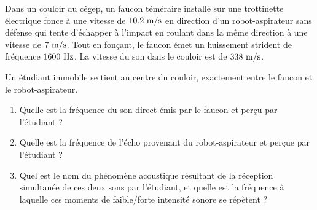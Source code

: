 Dans un couloir du cégep, un faucon téméraire installé sur une trottinette électrique fonce à une vitesse de $10.2\text{ m/s}$ en direction d'un robot-aspirateur sans défense qui tente d'échapper à l'impact en roulant dans la même direction à une vitesse de $7\text{ m/s}$. Tout en fonçant, le faucon émet un huissement strident de fréquence $1600\text{ Hz}$. La vitesse du son dans le couloir est de $338\text{ m/s}$.

Un étudiant immobile se tient au centre du couloir, exactement entre le faucon et le robot-aspirateur.
    \begin{enumerate}[label=\alph*)]
        \item Quelle est la fréquence du son direct émis par le faucon et perçu par l'étudiant ?
        \item Quelle est la fréquence de l'écho provenant du robot-aspirateur et perçue par l'étudiant ?
        \item Quel est le nom du phénomène acoustique résultant de la réception simultanée de ces deux sons par l'étudiant, et quelle est la fréquence à laquelle ces moments de faible/forte intensité sonore se répètent ?
    \end{enumerate}

\vspace{0.4cm}